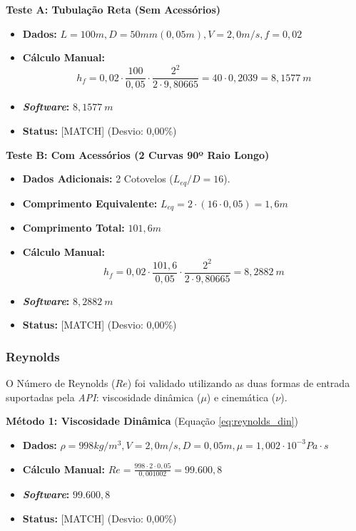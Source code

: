 \textbf{Teste A: Tubulação Reta (Sem Acessórios)}
\begin{itemize}
    \item \textbf{Dados:} $L=100m, D=50mm (0,05m), V=2,0m/s, f=0,02$
    \item \textbf{Cálculo Manual:}
    \begin{equation}
h_f = 0,02 \cdot \frac{100}{0,05} \cdot \frac{2^2}{2 \cdot 9,80665} = 40 \cdot 0,2039 = 8,1577 \ m
\label{eq:val_hf_calc_a}
\end{equation}
    \item \textbf{\textit{Software}:} $8,1577 \ m$
    \item \textbf{Status:} [MATCH] (Desvio: 0,00\%)
\end{itemize}

\textbf{Teste B: Com Acessórios (2 Curvas 90º Raio Longo)}
\begin{itemize}
    \item \textbf{Dados Adicionais:} 2 Cotovelos ($L_{eq}/D = 16$).
    \item \textbf{Comprimento Equivalente:} $L_{eq} = 2 \cdot (16 \cdot 0,05) = 1,6 m$
    \item \textbf{Comprimento Total:} $101,6 m$
    \item \textbf{Cálculo Manual:}
    \begin{equation}
h_f = 0,02 \cdot \frac{101,6}{0,05} \cdot \frac{2^2}{2 \cdot 9,80665} = 8,2882 \ m
\label{eq:val_hf_calc_b}
\end{equation}
    \item \textbf{\textit{Software}:} $8,2882 \ m$
    \item \textbf{Status:} [MATCH] (Desvio: 0,00\%)
\end{itemize}

\subsubsection{Reynolds}
O Número de Reynolds ($Re$) foi validado utilizando as duas formas de entrada suportadas pela \textit{API}: viscosidade dinâmica ($\mu$) e cinemática ($\nu$).

\textbf{Método 1: Viscosidade Dinâmica}
(Equação \ref{eq:reynolds_din})
\begin{itemize}
    \item \textbf{Dados:} $\rho=998 kg/m^3, V=2,0 m/s, D=0,05 m, \mu=1,002 \cdot 10^{-3} Pa \cdot s$
    \item \textbf{Cálculo Manual:} $Re = \frac{998 \cdot 2 \cdot 0,05}{0,001002} = 99.600,8$
    \item \textbf{\textit{Software}:} $99.600,8$
    \item \textbf{Status:} [MATCH] (Desvio: 0,00\%)
\end{itemize}

